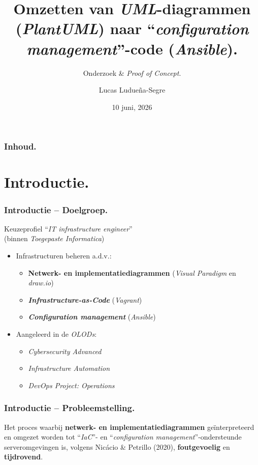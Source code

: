 \documentclass[aspectratio=169]{beamer}
\title[ITPCO Eindgesprek]{\Large Omzetten van \emph{UML}-diagrammen (\emph{PlantUML}) naar ``\emph{configuration management}''-code (\emph{Ansible}).}
\subtitle{\small Onderzoek \& \emph{Proof of Concept}.}
\author{Lucas Ludueña-Segre}
\date{10 juni, 2026}
\begin{document}

\frame{\maketitle}

\begin{frame}
  \frametitle{Inhoud.}

  \tableofcontents
\end{frame}


\section{Introductie.}

\begin{frame}
  \frametitle{\huge Introductie -- Doelgroep.}
  Keuzeprofiel ``\emph{IT infrastructure engineer}''\\(binnen \emph{Toegepaste Informatica})
  \begin{itemize}
    \item Infrastructuren beheren a.d.v.:
          \begin{itemize}
            \item \textbf{Netwerk- en implementatiediagrammen} (\emph{Visual Paradigm} en \emph{draw.io})
            \item \textbf{\emph{Infrastructure-as-Code}} (\emph{Vagrant})
            \item \textbf{\emph{Configuration management}} (\emph{Ansible})
          \end{itemize}
    \item Aangeleerd in de \emph{OLODs}:
          \begin{itemize}
            \item \emph{Cybersecurity Advanced}
            \item \emph{Infrastructure Automation}
            \item \emph{DevOps Project: Operations}
          \end{itemize}
  \end{itemize}
\end{frame}

\begin{frame}
  \frametitle{Introductie -- Probleemstelling.}
  Het proces waarbij \textbf{netwerk- en implementatiediagrammen} geïnterpreteerd en omgezet worden tot ``\emph{IaC}''- en ``\emph{configuration management}''-ondersteunde serveromgevingen is, volgens Nicácio \& Petrillo (2020), \textbf{foutgevoelig} en \textbf{tijdrovend}.
\end{frame}
\end{document}
